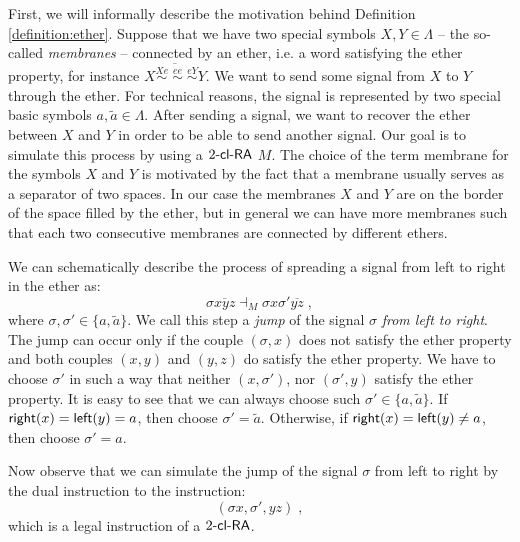 First, we will informally describe the motivation behind Definition \ref{definition:ether}. Suppose that we have two special symbols $X, Y \in \Lambda$ -- the so-called \emph{membranes} -- connected by an ether, i.e. a word satisfying the ether property, for instance $\overline{X \stackrel{Xe}{\sim} \; \stackrel{ee}{\sim} \; \stackrel{eY}{\sim} Y}$. We want to send some signal from $X$ to $Y$ through the ether. For technical reasons, the signal is represented by two special basic symbols $a, \tilde{a} \in \Lambda$. After sending a signal, we want to recover the ether between $X$ and $Y$ in order to be able to send another signal. Our goal is to simulate this process by using a $\kclRA[2]$ $M$. The choice of the term membrane for the symbols $X$ and $Y$ is motivated by the fact that a membrane usually serves as a separator of two spaces. In our case the membranes $X$ and $Y$ are on the border of the space filled by the ether, but in general we can have more membranes such that each two consecutive membranes are connected by different ethers.

We can schematically describe the process of spreading a signal from left to right in the ether as:
$$\sigma \overline{x y z} \dashv_M \sigma x \sigma' \overline{y z}\;,$$
where $\sigma, \sigma' \in \{a, \tilde{a}\}$. We call this step a \emph{jump} of the signal $\sigma$ \emph{from left to right}. The jump can occur only if the couple $(\sigma, x)$ does not satisfy the ether property and both couples $(x, y)$ and $(y, z)$ do satisfy the ether property. We have to choose $\sigma'$ in such a way that neither $(x, \sigma')$, nor $(\sigma', y)$ satisfy the ether property. It is easy to see that we can always choose such $\sigma' \in \{a, \tilde{a}\}$. If ${\sf right}(x) = {\sf left}(y) = a$, then choose $\sigma' = \tilde{a}$. Otherwise, if ${\sf right}(x) = {\sf left}(y) \neq a$, then choose $\sigma' = a$.

Now observe that we can simulate the jump of the signal $\sigma$ from left to right by the dual instruction to the instruction:
$$(\sigma x, \sigma', yz)\;,$$
which is a legal instruction of a $\kclRA[2]$.

